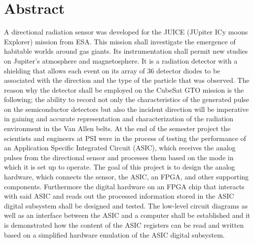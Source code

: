 \section*{Abstract}
\label{sec:abstract}

A directional radiation sensor was developed for the JUICE (JUpiter ICy moons Explorer) mission from ESA. 
This mission shall investigate the emergence of habitable worlds around gas giants. 
Its instrumentation shall permit new studies on Jupiter's atmosphere and magnetosphere.\cite{JUICE}
\newline
It is a radiation detector with a shielding that allows each event on its array of 36 detector diodes to be associated with the direction and the type of the particle that was observed. 
The reason why the detector shall be employed on the CubeSat GTO mission is the following; the ability to record not only the characteristics of the generated pulse on the semiconductor detectors but also the incident direction will be imperative in gaining and accurate representation and characterization of the radiation environment in the Van Allen belts.
\newline
At the end of the semester project the scientists and engineers at PSI were in the process of testing the performance of an Application Specific Integrated Circuit (ASIC), which receives the analog pulses from the directional sensor and processes them based on the mode in which it is set up to operate. 
The goal of this project is to design the analog hardware, which connects the sensor, the ASIC, an FPGA, and other supporting components.
Furthermore the digital hardware on an FPGA chip that interacts with said ASIC and reads out the processed information stored in the ASIC digital subsystem shall be designed and tested. 
The low-level circuit diagrams as well as an interface between the ASIC and a computer shall be established and it is demonstrated how the content of the ASIC registers can be read and written based on a simplified hardware emulation of the ASIC digital subsystem.
